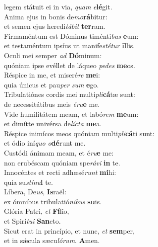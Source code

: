 \oddverse legem státuit ei in via, \textit{quam} \textit{e}\textbf{lé}git.\\
\evenverse Anima ejus in bonis de\textit{mo}\textbf{rá}bitur:~\*\\
\evenverse et semen ejus heredi\textit{tá}\textit{bit} \textbf{ter}ram.\\
\oddverse Firmaméntum est Dóminus timénti\textit{bus} \textbf{e}um:~\*\\
\oddverse et testaméntum ipsíus ut manife\textit{sté}\textit{tur} \textbf{il}lis.\\
\evenverse Oculi mei semper \textit{ad} \textbf{Dó}minum:~\*\\
\evenverse quóniam ipse evéllet de láqueo \textit{pe}\textit{des} \textbf{me}os.\\
\oddverse Réspice in me, et miseré\textit{re} \textbf{me}i:~\*\\
\oddverse quia únicus et pau\textit{per} \textit{sum} \textbf{e}go.\\
\evenverse Tribulatiónes cordis mei multi\textit{pli}\textbf{cá}tæ sunt:~\*\\
\evenverse de necessitátibus meis \textit{é}\textit{ru}\textbf{e} me.\\
\oddverse Vide humilitátem meam, et labó\textit{rem} \textbf{me}um:~\*\\
\oddverse et dimítte univérsa de\textit{lí}\textit{cta} \textbf{me}a.\\
\evenverse Réspice inimícos meos quóniam multi\textit{pli}\textbf{cá}ti sunt:~\*\\
\evenverse et ódio iní\textit{quo} \textit{o}\textbf{dé}runt me.\\
\oddverse Custódi ánimam meam, et é\textit{ru}\textbf{e} me:~\*\\
\oddverse non erubéscam quóniam spe\textit{rá}\textit{vi} \textbf{in} te.\\
\evenverse Innocéntes et recti adhæsé\textit{runt} \textbf{mi}hi:~\*\\
\evenverse quia su\textit{stí}\textit{nu}\textbf{i} te.\\
\oddverse Líbera, De\textit{us}, \textbf{Is}raël:~\*\\
\oddverse ex ómnibus tribulatió\textit{ni}\textit{bus} \textbf{su}is.\\
\evenverse Glória Patri, \textit{et} \textbf{Fí}lio,~\*\\
\evenverse et Spirí\textit{tu}\textit{i} \textbf{San}cto.\\
\oddverse Sicut erat in princípio, et nunc, \textit{et} \textbf{sem}per,~\*\\
\oddverse et in sǽcula sæcu\textit{ló}\textit{rum}. \textbf{A}men.\\
